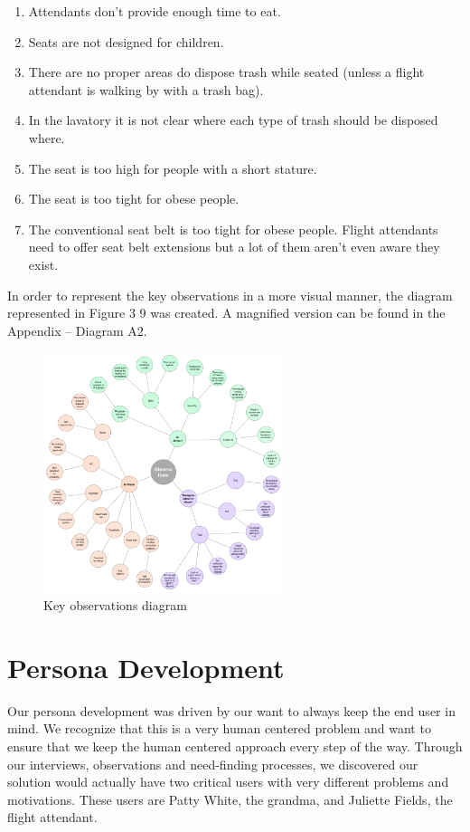 \documentclass[a4paper, 12pt,conference]{new_cit_thesis}
\begin{document}
\begin{enumerate}
  \item Attendants don’t provide enough time to eat. 
  \item Seats are not designed for children.
  \item There are no proper areas do dispose trash while seated (unless a flight attendant is walking by with a trash bag).
  \item In the lavatory it is not clear where each type of trash should be disposed where.
  \item The seat is too high for people with a short stature.
  \item The seat is too tight for obese people.
  \item The conventional seat belt is too tight for obese people. Flight attendants need to offer seat belt extensions but a lot of them aren’t even aware they exist.
\end{enumerate}

In order to represent the key observations in a more visual manner, the diagram represented in Figure 3 9 was created. A magnified version can be found in the Appendix – Diagram A2.

\begin{figure}[h]
  \centering
     \includegraphics[width=7cm]{images/image040}
   \caption{Key observations diagram}
  \label{fig:40}
\end{figure}

\section*{Persona Development}
Our persona development was driven by our want to always keep the end user in mind. We recognize that this is a very human centered problem and want to ensure that we keep the human centered approach every step of the way. Through our interviews, observations and need-finding processes, we discovered our solution would actually have two critical users with very different problems and motivations. These users are Patty White, the grandma, and Juliette Fields, the flight attendant.
\end{document}
